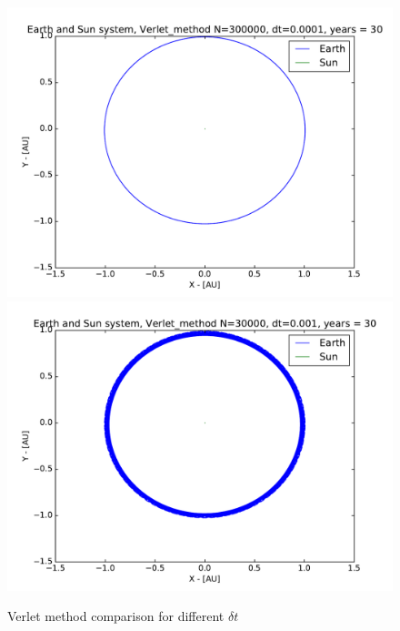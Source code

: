\documentclass[12pt]{article}
\begin{document}
\begin{figure}[hbtp]
\centering
\includegraphics[width=\linewidth]{Plots/Earth_Sun_Verlet_method.pdf}
\includegraphics[width=\linewidth]{Plots/Earth_Sun_Verlet_method_larger_dt.pdf}
\caption{Verlet method comparison for different $\delta t$}
\end{figure}

\newpage
\end{document}
